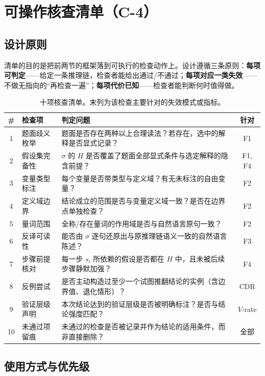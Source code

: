 \section{可操作核查清单（C-4）}\label{sec:checklist}

\subsection{设计原则}

清单的目的是把前两节的框架落到可执行的检查动作上。设计遵循三条原则：\textbf{每项可判定}——给定一条推理链，检查者能给出通过/不通过；\textbf{每项对应一类失效}——不做无指向的“再检查一遍”；\textbf{每项代价已知}——检查者能判断何时值得做。

\begin{table}[t]
\centering
\small
\caption{十项核查清单。末列为该检查主要针对的失效模式或指标。}
\label{tab:checklist}
\begin{tabularx}{\textwidth}{@{}c p{3.3cm} X c@{}}
\toprule
\textbf{\#} & \textbf{检查项} & \textbf{判定问题} & \textbf{针对} \\
\midrule
1 & 题面歧义枚举 & 题面是否存在两种以上合理读法？若存在，选中的解释是否显式记录？ & F1 \\
2 & 假设集完备性 & $\sigma$ 的 $H$ 是否覆盖了题面全部显式条件与选定解释的隐含前提？ & F1, F4 \\
3 & 变量类型标注 & 每个变量是否带类型与定义域？有无未标注的自由变量？ & F2 \\
4 & 定义域边界 & 结论成立的范围是否与变量定义域一致？是否在边界点单独检查？ & F2 \\
5 & 量词范围 & 全称/存在量词的作用域是否与自然语言原句一致？ & F2 \\
6 & 反译可读性 & 能否由 $\sigma$ 逐句还原出与原推理链语义一致的自然语言陈述？ & F3 \\
7 & 步骤前提核对 & 每一步 $s_i$ 所依赖的假设是否都在 $H$ 中，且未被后续步骤静默加强？ & F4 \\
8 & 反例尝试 & 是否主动构造过至少一个试图推翻结论的实例（含边界值、退化情形）？ & $\mathrm{CDR}$ \\
9 & 验证层级声明 & 本次结论达到的验证层级是否被明确标注？是否与结论强度匹配？ & $V$-rate \\
10 & 未通过项留痕 & 未通过的检查是否被记录并作为结论的适用条件，而非直接删除？ & 全部 \\
\bottomrule
\end{tabularx}
\end{table}

\subsection{使用方式与优先级}

